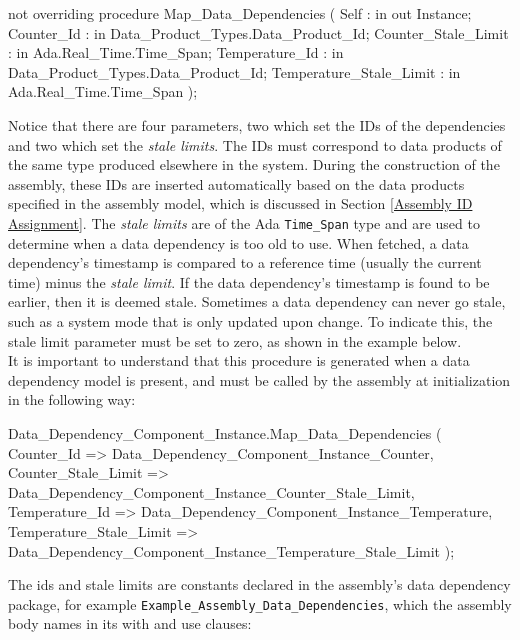 \vspace{5mm} %
\begin{adacode}
not overriding procedure Map_Data_Dependencies (
  Self : in out Instance; 
  Counter_Id : in Data_Product_Types.Data_Product_Id;
  Counter_Stale_Limit : in Ada.Real_Time.Time_Span;
  Temperature_Id : in Data_Product_Types.Data_Product_Id; 
  Temperature_Stale_Limit : in Ada.Real_Time.Time_Span
);
\end{adacode}
\vspace{5mm} %

Notice that there are four parameters, two which set the IDs of the dependencies and two which set the \textit{stale limits}. The IDs must correspond to data products of the same type produced elsewhere in the system. During the construction of the assembly, these IDs are inserted automatically based on the data products specified in the assembly model, which is discussed in Section \ref{Assembly ID Assignment}.  The \textit{stale limits} are of the Ada \texttt{Time\_Span} type and are used to determine when a data dependency is too old to use. When fetched, a data dependency's timestamp is compared to a reference time (usually the current time) minus the \textit{stale limit}. If the data dependency's timestamp is found to be earlier, then it is deemed stale. Sometimes a data dependency can never go stale, such as a system mode that is only updated upon change. To indicate this, the stale limit parameter must be set to zero, as shown in the example below. \\

It is important to understand that this procedure is generated when a data dependency model is present, and must be called by the assembly at initialization in the following way:

\vspace{5mm} %
\begin{adacode}
  Data_Dependency_Component_Instance.Map_Data_Dependencies (
    Counter_Id => Data_Dependency_Component_Instance_Counter,
    Counter_Stale_Limit => Data_Dependency_Component_Instance_Counter_Stale_Limit,
    Temperature_Id => Data_Dependency_Component_Instance_Temperature,
    Temperature_Stale_Limit => Data_Dependency_Component_Instance_Temperature_Stale_Limit
  );
\end{adacode}
\vspace{5mm} %

The ids and stale limits are constants declared in the assembly's data dependency package, for example \texttt{Example\_Assembly\_Data\_Dependencies}, which the assembly body names in its with and use clauses:


